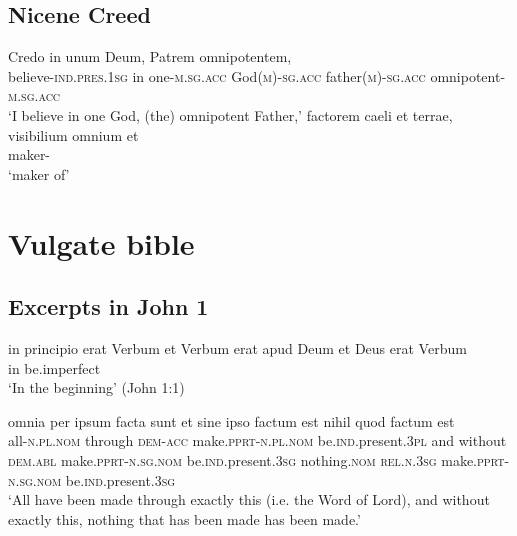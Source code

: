\documentclass[a4paper, oneside, 12pt]{report}
\newcommand*{\category}[1]{\textsc{#1}}
\newcommand{\translate}[1]{`#1'}
\begin{document}
\subsection{Nicene Creed}

\begin{exe}
    \ex \gll Credo in unum Deum, Patrem omnipotentem, \\
    believe-\category{ind}.\category{pres}.\category{1sg} in 
    one-\category{m}.\category{sg}.\category{acc} 
    God(\category{m})-\category{sg}.\category{acc} 
    father(\category{m})-\category{sg}.\category{acc}
    omnipotent-\category{m}.\category{sg}.\category{acc} \\
    \glt \translate{I believe in one God, (the) omnipotent Father,} 
    \ex \gll factorem caeli et terrae, visibilium omnium et \\ 
    maker- \\
    \glt \translate{maker of}
\end{exe}

\section{Vulgate bible}

\subsection{Excerpts in John 1}\label{sec:text.vulgate.john}

\begin{exe}
    \ex\label{ex:text.john.1.1} 
    \gll in principio erat Verbum et Verbum erat apud Deum et Deus erat Verbum \\
    in {} be.\acs{imperfect}  \\
    \glt \translate{In the beginning} (John 1:1)
    
    \ex\label{ex:text.john.1.3}
    \gll omnia per ipsum facta sunt 
    et sine ipso factum est nihil quod factum est \\
    all-\category{n}.\category{pl}.\category{nom} through \category{dem}-\category{acc}
    make.\category{pprt}-\category{n}.\category{pl}.\category{nom} 
    be.\category{ind}.\acs{present}.\category{3pl} 
    and without \category{dem}.\category{abl} 
    make.\category{pprt}-\category{n}.\category{sg}.\category{nom} 
    be.\category{ind}.\acs{present}.\category{3sg}
    nothing.\category{nom}
    \category{rel}.\category{n}.\category{3sg}
    make.\category{pprt}-\category{n}.\category{sg}.\category{nom} 
    be.\category{ind}.\acs{present}.\category{3sg} \\
    \glt \translate{All have been made through exactly this (i.e. the Word of Lord),
    and without exactly this, nothing that has been made has been made.}
\end{exe}
\end{document}

